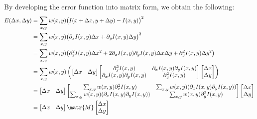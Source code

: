 By developing the error function into matrix form, we obtain the following:
\[
    \begin{split}
        E(\Delta x, \Delta y) &= \sum_{x, y} w(x, y) \big( I(x+\Delta x, y+\Delta y) - I(x, y) \big)^2 \\
        &= \sum_{x, y} w(x, y) \big( \partial_x I(x, y)\Delta x + \partial_y I(x, y)\Delta y \big)^2 \\
        &= \sum_{x, y} w(x, y) \big( \partial_x^2 I(x, y)\Delta x^2 + 2 \partial_x I(x, y) \partial_y I(x, y) \Delta x \Delta y + \partial_y^2 I(x, y)\Delta y^2 \big) \\
        &= \sum_{x, y} w(x, y) \left( 
            \begin{bmatrix} \Delta x & \Delta y \end{bmatrix} 
            \begin{bmatrix} 
                \partial_x^2 I(x, y)                    & \partial_x I(x, y) \partial_y I(x, y) \\
                \partial_x I(x, y) \partial_y I(x, y)   & \partial_y^2 I(x, y)
            \end{bmatrix} 
            \begin{bmatrix} \Delta x \\ \Delta y \end{bmatrix} 
        \right) \\
        &= \begin{bmatrix} \Delta x & \Delta y \end{bmatrix} 
            \begin{bmatrix} 
                \sum_{x, y} w(x, y) \partial_x^2 I(x, y)                        & \sum_{x, y} w(x, y) (\partial_x I(x, y) \partial_y I(x, y)) \\
                \sum_{x, y} w(x, y) (\partial_x I(x, y) \partial_y I(x, y))     & \sum_{x, y} w(x, y) \partial_y^2 I(x, y)
            \end{bmatrix} 
            \begin{bmatrix} \Delta x \\ \Delta y \end{bmatrix} \\
        &= \begin{bmatrix} \Delta x & \Delta y \end{bmatrix} 
            \matr{M}
            \begin{bmatrix} \Delta x \\ \Delta y \end{bmatrix} \\
    \end{split}
\]

